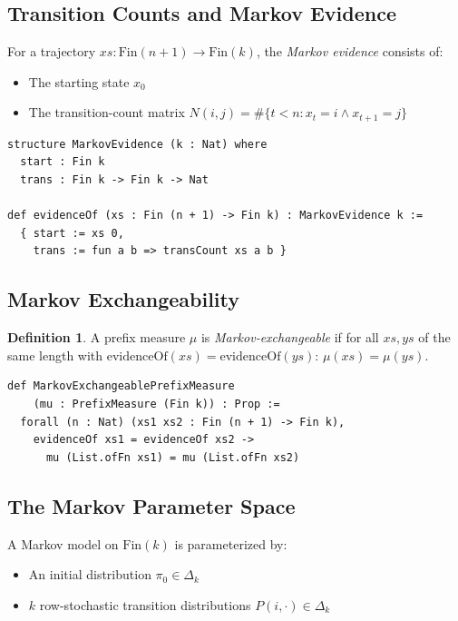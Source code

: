 \documentclass[11pt,a4paper]{article}
\theoremstyle{definition}
\newtheorem{definition}{Definition}[section]
\begin{document}
\subsection{Transition Counts and Markov Evidence}

For a trajectory $xs : \mathrm{Fin}(n+1) \to \mathrm{Fin}(k)$, the
\emph{Markov evidence} consists of:
\begin{itemize}
\item The starting state $x_0$
\item The transition-count matrix $N(i,j) = \#\{t < n : x_t = i \land x_{t+1} = j\}$
\end{itemize}

\begin{lstlisting}
structure MarkovEvidence (k : Nat) where
  start : Fin k
  trans : Fin k -> Fin k -> Nat

def evidenceOf (xs : Fin (n + 1) -> Fin k) : MarkovEvidence k :=
  { start := xs 0,
    trans := fun a b => transCount xs a b }
\end{lstlisting}

\subsection{Markov Exchangeability}

\begin{definition}
A prefix measure $\mu$ is \emph{Markov-exchangeable} if for all $xs, ys$ of
the same length with $\mathrm{evidenceOf}(xs) = \mathrm{evidenceOf}(ys)$:
$\mu(xs) = \mu(ys)$.
\end{definition}

\begin{lstlisting}
def MarkovExchangeablePrefixMeasure
    (mu : PrefixMeasure (Fin k)) : Prop :=
  forall (n : Nat) (xs1 xs2 : Fin (n + 1) -> Fin k),
    evidenceOf xs1 = evidenceOf xs2 ->
      mu (List.ofFn xs1) = mu (List.ofFn xs2)
\end{lstlisting}

\subsection{The Markov Parameter Space}

A Markov model on $\mathrm{Fin}(k)$ is parameterized by:
\begin{itemize}
\item An initial distribution $\pi_0 \in \Delta_k$
\item $k$ row-stochastic transition distributions $P(i, \cdot) \in \Delta_k$
\end{itemize}
\end{document}
